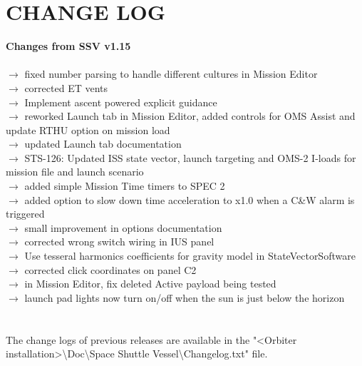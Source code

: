 \documentclass[Space_Shuttle_Vessel_Manual.tex]{subfiles}
\begin{document}
\section{CHANGE LOG}
\label{sec:change-log}
\noindent
\textbf{Changes from SSV v1.15}\\\\
$\rightarrow$ fixed number parsing to handle different cultures in Mission Editor\\
$\rightarrow$ corrected ET vents\\
$\rightarrow$ Implement ascent powered explicit guidance\\
$\rightarrow$ reworked Launch tab in Mission Editor, added controls for OMS Assist and update RTHU option on mission load\\
$\rightarrow$ updated Launch tab documentation\\
$\rightarrow$ STS-126: Updated ISS state vector, launch targeting and OMS-2 I-loads for mission file and launch scenario\\
$\rightarrow$ added simple Mission Time timers to SPEC 2\\
$\rightarrow$ added option to slow down time acceleration to x1.0 when a C\&W alarm is triggered\\
$\rightarrow$ small improvement in options documentation\\
$\rightarrow$ corrected wrong switch wiring in IUS panel\\
$\rightarrow$ Use tesseral harmonics coefficients for gravity model in StateVectorSoftware\\
$\rightarrow$ corrected click coordinates on panel C2\\
$\rightarrow$ in Mission Editor, fix deleted Active payload being tested\\
$\rightarrow$ launch pad lights now turn on/off when the sun is just below the horizon\\
\\
\\
The change logs of previous releases are available in the "<Orbiter installation>\textbackslash Doc\textbackslash Space Shuttle Vessel\textbackslash Changelog.txt" file.
\end{document}
